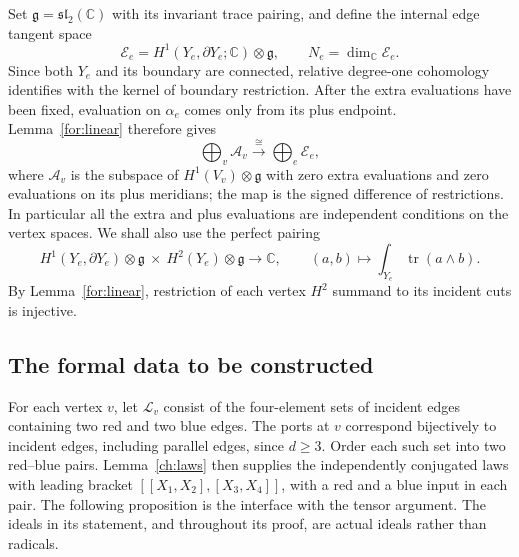 Set $\mathfrak g=\mathfrak{sl}_2(\mathbb C)$ with its invariant trace
pairing, and define the internal edge tangent space
\[
 \mathcal E_e=H^1(Y_e,\partial Y_e;\mathbb C)\otimes\mathfrak g,
 \qquad N_e=\dim_{\mathbb C}\mathcal E_e.
\]
Since both $Y_e$ and its boundary are connected, relative degree-one
cohomology identifies with the kernel of boundary restriction.  After
the extra evaluations have been fixed, evaluation on $\alpha_e$ comes
only from its plus endpoint.  Lemma~\ref{for:linear} therefore gives
\begin{equation}
\label{for:tangent-isomorphism}
 \bigoplus_v \mathcal A_v\xrightarrow{\ \cong\ }\bigoplus_e\mathcal E_e,
\end{equation}
where $\mathcal A_v$ is the subspace of $H^1(V_v)\otimes\mathfrak g$ with zero
extra evaluations and zero evaluations on its plus meridians; the map
is the signed difference of restrictions.  In particular all the
extra and plus evaluations are independent conditions on the vertex
spaces.  We shall also use the perfect pairing
\begin{equation}
\label{for:edge-pairing}
 H^1(Y_e,\partial Y_e)\otimes\mathfrak g
 \ \times\ H^2(Y_e)\otimes\mathfrak g\longrightarrow\mathbb C,
 \qquad (a,b)\longmapsto\int_{Y_e}\operatorname{tr}(a\wedge b).
\end{equation}
By Lemma~\ref{for:linear}, restriction of each vertex $H^2$ summand
to its incident cuts is injective.

\subsection{The formal data to be constructed}

For each vertex $v$, let $\mathcal L_v$ consist of the four-element
sets of incident edges containing two red and two blue edges.
The ports at $v$ correspond bijectively to incident edges, including
parallel edges, since $d\geq3$.  Order each such set into two red--blue
pairs.  Lemma~\ref{ch:laws} then supplies the independently conjugated
laws with leading bracket
$[[X_1,X_2],[X_3,X_4]]$, with a red and a blue input in each pair.
The following proposition is the interface with the tensor argument.
The ideals in its statement, and throughout its proof, are actual
ideals rather than radicals.

